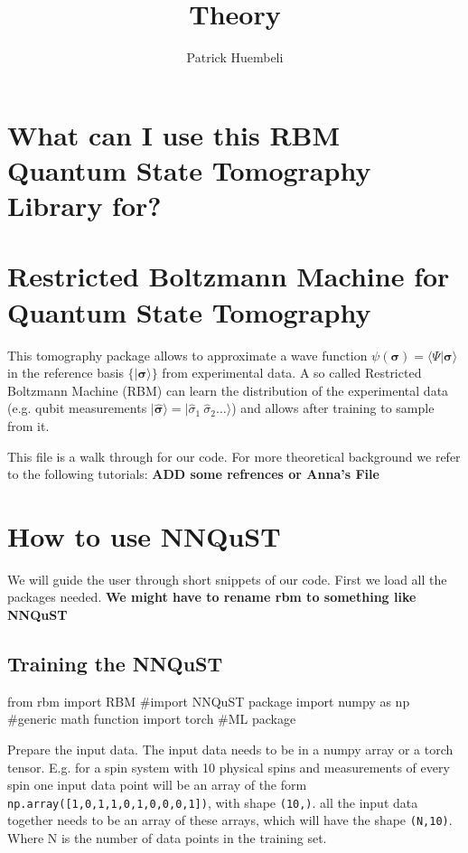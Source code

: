 \documentclass[a4paper]{article}
\title{Theory}
\author{Patrick Huembeli}
\begin{document}
\section{What can I use this RBM Quantum State Tomography Library for?}

\section{Restricted Boltzmann Machine for Quantum State Tomography}


This tomography package allows to approximate a wave function $\psi( \boldsymbol{\sigma} )  = \langle \Psi \vert \boldsymbol{\sigma} \rangle$ in the reference basis $\{ \vert \boldsymbol{ \sigma} \rangle \}$ from experimental data. A so called Restricted Boltzmann Machine (RBM) can learn the distribution of the experimental data (e.g. qubit measurements $\vert \widehat{\boldsymbol{ \sigma}} \rangle = \vert \hat{ \sigma}_1~\hat{ \sigma}_2 \dots \rangle$) and allows after training to sample from it.

This file is a walk through for our code. For more theoretical background we refer to the following tutorials:
\textbf{ADD some refrences or Anna's File}

\section{How to use NNQuST}

We will guide the user through short snippets of our code. First we load all the packages needed. \textbf{We might have to rename rbm to something like NNQuST} 

\subsection{Training the NNQuST}

\begin{python}
from rbm import RBM #import NNQuST package
import numpy as np #generic math function
import torch #ML package
\end{python}

Prepare the input data. The input data needs to be in a numpy array or a torch tensor. E.g. for a spin system with 10 physical spins and measurements of every spin one input data point will be an array of the form \verb|np.array([1,0,1,1,0,1,0,0,0,1])|, with shape \verb|(10,)|. all the input data together needs to be an array of these arrays, which will have the shape \verb|(N,10)|. Where N is the number of data points in the training set.
\end{document}
